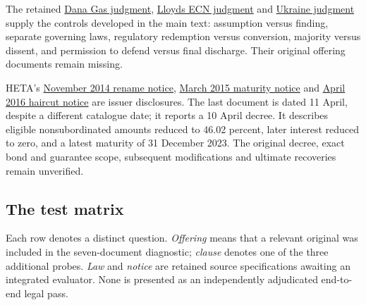 \documentclass[12pt,a4paper,oneside,openany]{book}
\begin{document}
The retained \href{../prospectus/corner-cases-2026-10-04/sources/jur-more-dana-judgment/source.pdf}
{Dana Gas judgment}, \href{../prospectus/corner-cases-2026-10-04/sources/jur-more-lloyds-generated/source.pdf}
{Lloyds ECN judgment} and
\href{../prospectus/corner-cases-2026-10-04/sources/jur-more-ukraine-judgment/source.pdf}
{Ukraine judgment} supply the controls developed in the main text:
assumption versus finding, separate governing laws, regulatory redemption
versus conversion, majority versus dissent, and permission to defend versus
final discharge. Their original offering documents remain missing.

HETA's \href{../prospectus/corner-cases-2026-10-04/sources/jur-more-heta-2232299/source.pdf}
{November 2014 rename notice}, \href{../prospectus/corner-cases-2026-10-04/sources/jur-more-heta-2356087/source.pdf}
{March 2015 maturity notice} and
\href{../prospectus/corner-cases-2026-10-04/sources/jur-more-heta-2789331/source.pdf}
{April 2016 haircut notice} are issuer disclosures.
The last document is dated 11 April, despite a different catalogue date;
it reports a 10 April decree. It describes eligible nonsubordinated amounts
reduced to 46.02 percent, later interest reduced to zero, and a latest
maturity of 31 December 2023. The original decree, exact bond and guarantee
scope, subsequent modifications and ultimate recoveries remain unverified.

\subsection{The test matrix}

Each row denotes a distinct question. \emph{Offering} means that a relevant
original was included in the seven-document diagnostic; \emph{clause} denotes
one of the three additional probes. \emph{Law} and \emph{notice} are retained
source specifications awaiting an integrated evaluator. None is presented
as an independently adjudicated end-to-end legal pass.
\end{document}
